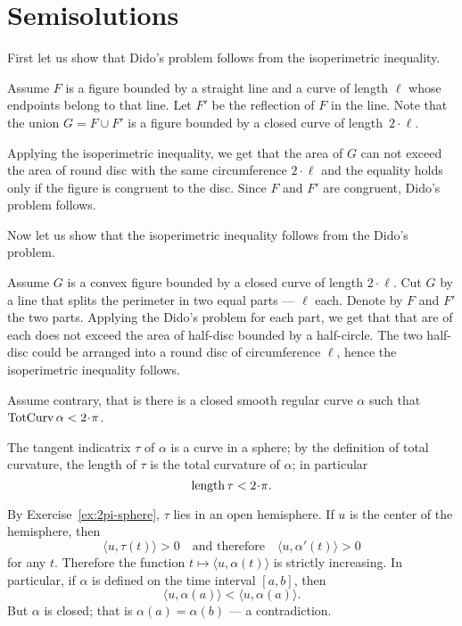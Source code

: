 \appendix
\chapter{Semisolutions}

First let us show that Dido's problem follows from the isoperimetric inequality.

Assume $F$ is a figure bounded by a straight line and a curve of length $\ell$ whose endpoints belong to that line. 
Let $F'$ be the reflection of $F$ in the line.
Note that the union $G=F\cup F'$ is a figure bounded by a closed curve of length~$2\cdot\ell$.

Applying the isoperimetric inequality, we get that the area of $G$ can not exceed the area of round disc with the same circumference $2\cdot\ell$
and the equality holds only if the figure is congruent to the disc.
Since $F$ and $F'$ are congruent, Dido's problem follows.

Now let us show that the isoperimetric inequality follows from the Dido's problem.

Assume $G$ is a convex figure bounded by a closed curve of length $2\cdot\ell$.
Cut $G$ by a line that splits the perimeter in two equal parts --- $\ell$ each.
Denote by $F$ and $F'$ the two parts.
Applying the Dido's problem for each part, we get that that are of each does not exceed the area of half-disc bounded by a half-circle.
The two half-disc could be arranged into a round disc of circumference $\ell$, hence the isoperimetric inequality follows.




 Assume contrary, that is there is a closed smooth regular curve $\alpha$ such that $\tc\alpha<2\cdot\pi$.

The tangent indicatrix $\tau$ of $\alpha$ is a curve in a sphere;
by the definition of total curvature, the length of $\tau$ is the total curvature of $\alpha$; in particular
\[\length \tau <2\cdot\pi.\]

By Exercise~\ref{ex:2pi-sphere}, $\tau$ lies in an open hemisphere.
If $u$ is the center of the hemisphere, then 
\[\langle u,\tau(t)\rangle>0\quad\text{and therefore}\quad \langle u,\alpha'(t)\rangle>0\]
for any $t$.
Therefore the function $t\mapsto \langle u,\alpha(t)\rangle$ is strictly increasing.
In particular, if $\alpha$ is defined on the time interval $[a,b]$, then
\[\langle u,\alpha(a)\rangle<\langle u,\alpha(a)\rangle.\]
But $\alpha$ is closed; that is $\alpha(a)=\alpha(b)$ --- a contradiction.


